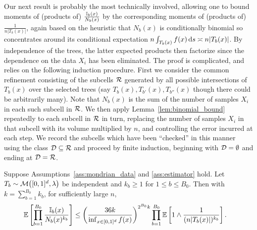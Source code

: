 Our next result is probably the most technically involved,
allowing one to bound moments of
(products of) $\frac{\mathbb{I}_b(x)}{N_b(x)}$ by the corresponding moments of
(products of) $\frac{1}{n |T_b(x)|}$, again based on the heuristic
that $N_b(x)$ is conditionally binomial so concentrates around
its conditional expectation
$n \int_{T_b(x)} f(x) \,\mathrm{d}s \asymp n |T_b(x)|$.
By independence of the trees,
the latter expected products then factorize
since the dependence on the data $X_i$ has been eliminated.
The proof is complicated, and relies on the following induction procedure.
First we consider the common refinement consisting of the
subcells $\mathcal{R}$ generated by all possible intersections
of $T_b(x)$ over the selected trees
(say $T_{b}(x), T_{b'}(x), T_{b''}(x)$
though there could be arbitrarily many).
Note that $N_b(x)$ is the sum of the number of
samples $X_i$ in each such subcell in $\mathcal{R}$.
We then apply Lemma~\ref{lem:binomial_bound} repeatedly
to each subcell in $\mathcal{R}$ in turn, replacing
the number of samples $X_i$ in that subcell with its volume
multiplied by $n$, and controlling the error incurred at each step.
We record the subcells which have been ``checked'' in this manner
using the class $\mathcal{D} \subseteq \mathcal{R}$ and proceed by finite induction,
beginning with $\mathcal{D} = \emptyset$ and ending at $\mathcal{D} = \mathcal{R}$.

\begin{lemma}%
  \label{lem:moment_denominator}

  Suppose Assumptions~\ref{ass:mondrian_data}
  and \ref{ass:estimator} hold.
  Let $T_b \sim \mathcal{M}\big([0,1]^d, \lambda\big)$
  be independent and $k_b \geq 1$ for $1 \leq b \leq B_0$.
  Then with $k = \sum_{b=1}^{B_0} k_b$,
  for sufficiently large $n$,
  \begin{align*}
    \mathbb{E}\left[
      \prod_{b=1}^{B_0}
      \frac{\mathbb{I}_b(x)}{N_b(x)^{k_b}}
    \right]
    &\leq
    \left( \frac{36k}{\inf_{x \in [0,1]^d} f(x)} \right)^{2^{B_0} k}
    \prod_{b=1}^{B_0}
    \mathbb{E} \left[
      1 \wedge
      \frac{1}{(n |T_b(x)|)^{k_b}}
    \right].
  \end{align*}
\end{lemma}

